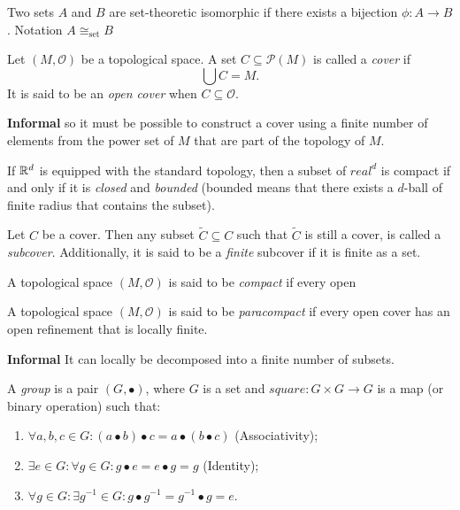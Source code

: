 \begin{definition}
    Two sets \(A\) and \(B\) are set-theoretic isomorphic if there exists a bijection \(\phi: A \to B\). Notation \(A \cong_\text{set} B\)
\end{definition}

\begin{definition}[Cover]
    Let \((M, \mathscr{O})\) be a topological space. A set \(C \subseteq \mathscr{P}(M)\) is called a \emph{cover} if
    \[ \bigcup C = M. \]
    It is said to be an \emph{open cover} when \(C \subseteq \mathscr{O}.\)
\end{definition}

\textbf{Informal} so it must be possible to construct a cover using a finite number of elements from the power set of \(M\) that are part of the topology of \(M\).

If \(\mathbb{R}^d\) is equipped with the standard topology, then a subset of \(real^d\) is compact if and only if it is \emph{closed} and \emph{bounded} (bounded means that there exists a \(d\)-ball of finite radius that contains the subset).


\begin{definition}[Subcover]
    Let \(C\) be a cover. Then any subset \(\tilde{C}\subseteq C\) such that \(\tilde{C}\) is still a cover, is called a \emph{subcover}. Additionally, it is said to be a \emph{finite} subcover if it is finite as a set.
\end{definition}

\begin{definition}[Compact]
    A topological space \((M, \mathscr{O})\) is said to be \emph{compact} if every open 
\end{definition}

\begin{definition}[Paracompact]
    A topological space \((M, \mathscr{O})\) is said to be \emph{paracompact} if every open cover has an open refinement that is locally finite.
\end{definition}

\textbf{Informal} It can locally be decomposed into a finite number of subsets.

\begin{definition}[Group]
    A \emph{group} is a pair \((G, \bullet)\), where \(G\) is a set and \(square: G \times G \to G\) is a map (or binary operation) such that:
    \begin{enumerate}[label=(\roman*), itemsep=0.2ex, partopsep=0.2ex]
        \item \(\forall a, b, c \in G: (a \bullet b) \bullet c = a \bullet (b \bullet c)\) (Associativity);
        \item \(\exists e \in G: \forall g \in G: g \bullet e = e \bullet g = g\) (Identity);
        \item \(\forall g \in G: \exists g^{-1} \in G: g \bullet g^{-1} = g^{-1} 
            \bullet g = e.\)
    \end{enumerate}
\end{definition}

